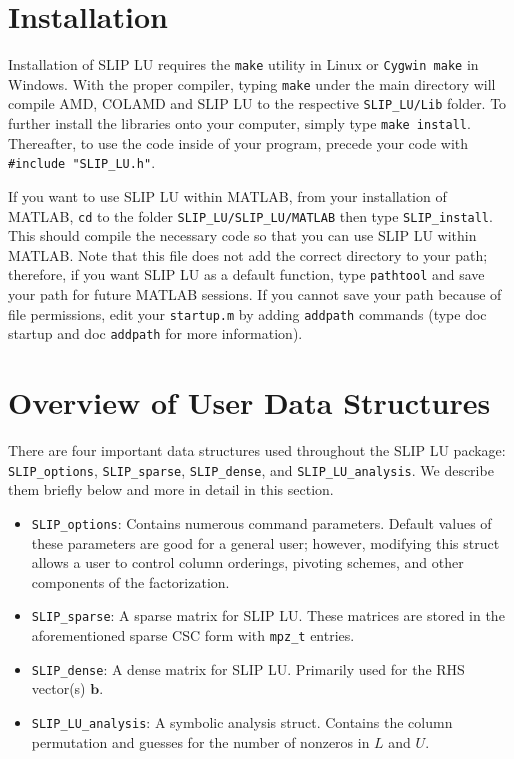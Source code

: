 \documentclass[12pt]{article}
\theoremstyle{definition}
\begin{document}
\section{Installation} \label{s:install}

Installation of SLIP LU requires the \verb|make| utility in Linux or
\verb|Cygwin make| in Windows. With the proper compiler, typing \verb|make|
under the main directory will compile AMD, COLAMD and SLIP LU to the respective
\verb'SLIP_LU/Lib' folder. To further install the libraries onto your computer,
simply type \verb|make install|.  Thereafter, to use the code inside of your
program, precede your code with \verb|#include "SLIP_LU.h"|.

If you want to use SLIP LU within MATLAB, from your installation of MATLAB,
\verb|cd| to the folder \verb|SLIP_LU/SLIP_LU/MATLAB| then type
\verb|SLIP_install|. This should compile the necessary code so that you can use
SLIP LU within MATLAB. Note that this file does not add the correct directory
to your path; therefore, if you want SLIP LU as a default function, type
\verb|pathtool| and save your path for future MATLAB sessions. If you cannot
save your path because of file permissions, edit your \verb|startup.m| by
adding \verb|addpath| commands (type doc startup and doc \verb|addpath| for
more information).

\section{Overview of User Data Structures} \label{s:Structures}

There are four important data structures used throughout the SLIP LU package:
\verb|SLIP_options|, \verb|SLIP_sparse|, \verb|SLIP_dense|, and
\verb|SLIP_LU_analysis|. We describe them briefly below and more in detail in
this section.

\begin{itemize}
    \item \verb|SLIP_options|: Contains numerous command parameters. Default
    values of these parameters are good for a general user; however, modifying
    this struct allows a user to control column orderings, pivoting schemes,
    and other components of the factorization.

    \item \verb|SLIP_sparse|: A sparse matrix for SLIP LU. These matrices are
    stored in the aforementioned sparse CSC form with \verb|mpz_t| entries.

    \item \verb|SLIP_dense|: A dense matrix for SLIP LU. Primarily used for the
    RHS vector(s) $\mathbf{b}$.

    \item \verb|SLIP_LU_analysis|: A symbolic analysis struct. Contains the
    column permutation and guesses for the number of nonzeros in $L$ and $U$.
\end{itemize}
\end{document}
